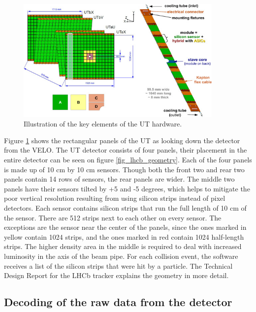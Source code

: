 \documentclass[12pt]{article}
\begin{document}
\begin{figure}[H]
	\begin{center}
		\includegraphics[width=0.9\textwidth]{detector_ut_geometry}
	\end{center}
	\caption[UT detector hardware blueprint]{Illustration of the key elements of the UT hardware. \cite{tracker_tdr}}
	\label{fig_ut_geometry}
\end{figure}

Figure \ref{fig_ut_geometry} shows the rectangular panels of the UT as looking down the detector from the VELO. The UT detector consists of four panels, their placement in the entire detector can be seen on figure \ref{fig_lhcb_geometry}. Each of the four panels is made up of 10 cm by 10 cm sensors. Though both the front two and rear two panels contain 14 rows of sensors, the rear panels are wider. The middle two panels have their sensors tilted by +5 and -5 degrees, which helps to mitigate the poor vertical resolution resulting from using silicon strips instead of pixel detectors. Each sensor contains silicon strips that run the full length of 10 cm of the sensor. There are 512 strips next to each other on every sensor. The exceptions are the sensor near the center of the panels, since the ones marked in yellow contain 1024 strips, and the ones marked in red contain 1024 half-length strips. The higher density area in the middle is required to deal with increased luminosity in the axis of the beam pipe. For each collision event, the software receives a list of the silicon strips that were hit by a particle. The Technical Design Report for the LHCb tracker\cite{tracker_tdr} explains the geometry in more detail.


\subsection{Decoding of the raw data from the detector}
\end{document}

